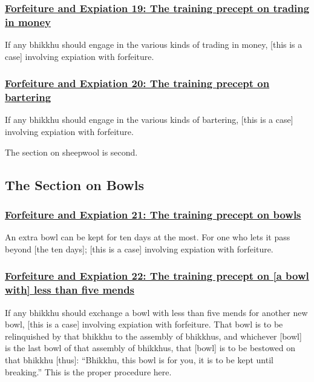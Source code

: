 \subsubsection*{\hyperref[np19]{Forfeiture and Expiation 19: The training precept on trading in money}}
\label{forf-exp19}
If any bhikkhu should engage in the various kinds of trading in money, [this is a case] involving expiation with forfeiture.

\subsubsection*{\hyperref[np20]{Forfeiture and Expiation 20: The training precept on bartering}}
\label{forf-exp20}
If any bhikkhu should engage in the various kinds of bartering, [this is a case] involving expiation with forfeiture.

The section on sheepwool is second.

\setsubsecheadstyle{\subsectionFmt}
\subsection{The Section on Bowls}
\vspace{0.2cm}

\subsubsection*{\hyperref[np21]{Forfeiture and Expiation 21: The training precept on bowls}}
\label{forf-exp21}
An extra bowl can be kept for ten days at the most. For one who lets it pass beyond [the ten days]; [this is a case] involving expiation with forfeiture.

\subsubsection*{\hyperref[np22]{Forfeiture and Expiation 22: The training precept on [a bowl with] less than five mends}}
\label{forf-exp22}
If any bhikkhu should exchange a bowl with less than five mends for another new bowl, [this is a case] involving expiation with forfeiture. That bowl is to be relinquished by that bhikkhu to the assembly of bhikkhus, and whichever [bowl] is the last bowl of that assembly of bhikkhus, that [bowl] is to be bestowed on that bhikkhu [thus]: ``Bhikkhu, this bowl is for you, it is to be kept until breaking.'' This is the proper procedure here.

